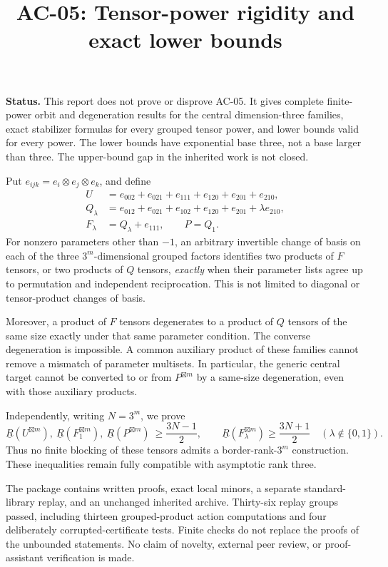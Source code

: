 \documentclass[11pt]{article}
\title{AC-05: Tensor-power rigidity and exact lower bounds}
\author{}\date{}
\theoremstyle{remark}\newtheorem{remark}[theorem]{Remark}
\newcommand{\BR}{\underline R}
\newcommand{\gp}{\boxtimes}
\begin{document}
\maketitle
\vspace{-13mm}
\textbf{Status.} This report does not prove or disprove AC-05. It gives complete finite-power orbit and degeneration results for the central dimension-three families, exact stabilizer formulas for every grouped tensor power, and lower bounds valid for every power. The lower bounds have exponential base three, not a base larger than three. The upper-bound gap in the inherited work is not closed.

Put $e_{ijk}=e_i\otimes e_j\otimes e_k$, and define
\begin{align*}
 U&=e_{002}+e_{021}+e_{111}+e_{120}+e_{201}+e_{210},\\
 Q_\lambda&=e_{012}+e_{021}+e_{102}+e_{120}+e_{201}+\lambda e_{210},\\
 F_\lambda&=Q_\lambda+e_{111},\qquad P=Q_1.
\end{align*}
For nonzero parameters other than $-1$, an arbitrary invertible change of basis on each of the three $3^m$-dimensional grouped factors identifies two products of $F$ tensors, or two products of $Q$ tensors, \emph{exactly} when their parameter lists agree up to permutation and independent reciprocation. This is not limited to diagonal or tensor-product changes of basis.

Moreover, a product of $F$ tensors degenerates to a product of $Q$ tensors of the same size exactly under that same parameter condition. The converse degeneration is impossible. A common auxiliary product of these families cannot remove a mismatch of parameter multisets. In particular, the generic central target cannot be converted to or from $P^{\gp m}$ by a same-size degeneration, even with those auxiliary products.

Independently, writing $N=3^m$, we prove
\[
 \BR(U^{\gp m}),\ \BR(F_1^{\gp m}),\ \BR(P^{\gp m})\ \geq\frac{3N-1}{2},
 \qquad
 \BR(F_\lambda^{\gp m})\geq\frac{3N+1}{2}\quad(\lambda\notin\{0,1\}).
\]
Thus no finite blocking of these tensors admits a border-rank-$3^m$ construction. These inequalities remain fully compatible with asymptotic rank three.

The package contains written proofs, exact local minors, a separate standard-library replay, and an unchanged inherited archive. Thirty-six replay groups passed, including thirteen grouped-product action computations and four deliberately corrupted-certificate tests. Finite checks do not replace the proofs of the unbounded statements. No claim of novelty, external peer review, or proof-assistant verification is made.
\end{document}
